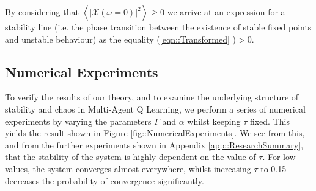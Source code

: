 \documentclass[.../main.tex]{subfiles}
\begin{document}
    By
    considering that $\left<|\mathcal{X}(\omega =
    0)|^2
    \right> \geq 0$  we arrive at an expression for a stability line (i.e. the phase transition
    between the
    existence of stable fixed points and unstable behaviour) as the equality (\ref{eqn::Transformed}
    )$>0$.


    \subsection{Numerical Experiments} %
    \label{sub:numerical_experiments}
    
    To verify the results of our theory, and to examine the underlying structure of stability and
    chaos in Multi-Agent Q Learning, we perform a series of numerical experiments by varying the
    parameters $\Gamma$ and $\alpha$ whilst keeping $\tau$ fixed. This yields the result shown in
    Figure \ref{fig::NumericalExperiments}. We see from this, and from the further experiments shown
    in Appendix \ref{app::ResearchSummary}, that the stability of the system is highly dependent on
    the value of $\tau$.
    For
    low values, the system converges almost everywhere, whilst increasing $\tau$ to 0.15 decreases
    the probability of convergence significantly.
\end{document}
